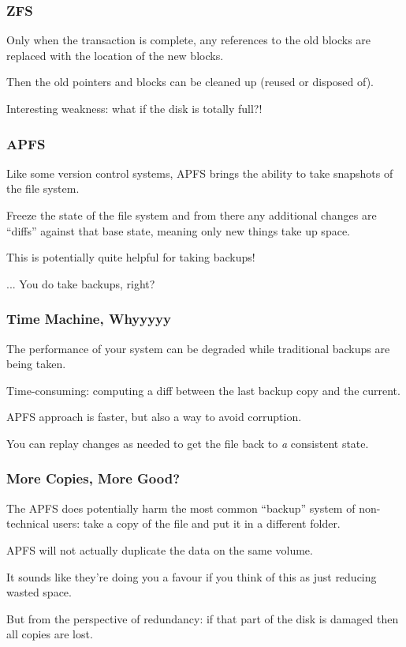 \begin{frame}
	\frametitle{ZFS}

	Only when the transaction is complete, any references to the old blocks are replaced with the location of the new blocks.

	Then the old pointers and blocks can be cleaned up (reused or disposed of).

	Interesting weakness: what if the disk is totally full?!

\end{frame}

\begin{frame}
	\frametitle{APFS}

	Like some version control systems, APFS brings the ability to take snapshots of the file system.

	Freeze the state of the file system and from there any additional changes are ``diffs'' against that base state, meaning only new things take up space.

	This is potentially quite helpful for taking backups!


	... You do take backups, right?

\end{frame}


\begin{frame}
	\frametitle{Time Machine, Whyyyyy}

	The performance of your system can be degraded while traditional backups are being taken.

	Time-consuming: computing a diff between the last backup copy and the current.

	APFS approach is faster, but also a way to avoid corruption.

	You can replay changes as needed to get the file back to \textit{a} consistent state.

\end{frame}


\begin{frame}
	\frametitle{More Copies, More Good?}

	The APFS does potentially harm the most common ``backup'' system of non-technical users: take a copy of the file and put it in a different folder.

	APFS will not actually duplicate the data on the same volume.

	It sounds like they're doing you a favour if you think of this as just reducing wasted space.

	But from the perspective of redundancy: if that part of the disk is damaged then all copies are lost.

\end{frame}

